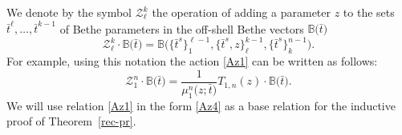 \documentclass[10pt,a4paper]{amsart}
\newcommand{\bt}{{\bar t}}
\theoremstyle{definition}
\def\BB{{\mathbb{B}}}
\def\r#1{\eqref{#1}}
\def\Z{\mathcal{Z}}
\begin{document}
We denote by the symbol $\Z_{\ell}^k$ the operation of adding a parameter $z$ to the sets $\bt^\ell,\dots,\bt^{k-1}$
of Bethe parameters
in the off-shell Bethe vectors $\BB\bigl(\bt\bigr)$
\begin{equation}\label{Az3}
\Z_{\ell}^k\cdot \BB\bigl(\bt\bigr)=\BB\bigl(\bigl\{\bt^s\bigr\}_1^{\ell-1},\bigl\{\bt^s,z\bigr\}_\ell^{k-1},\bigl\{\bt^s\bigr\}_k^{n-1}\bigr) .
\end{equation}
For example, using this notation the action \r{Az1} can be written as follows:
\begin{equation}\label{Az4}
\Z_1^n\cdot\BB\bigl(\bt\bigr)=\frac{1}{\mu_1^n\bigl(z;\bt\bigr)} T_{1,n}(z)\cdot \BB\bigl(\bt\bigr) .
\end{equation}
We will use relation \r{Az1} in the form \r{Az4} as a base relation for
the inductive proof of Theorem~\ref{rec-pr}.
\end{document}
